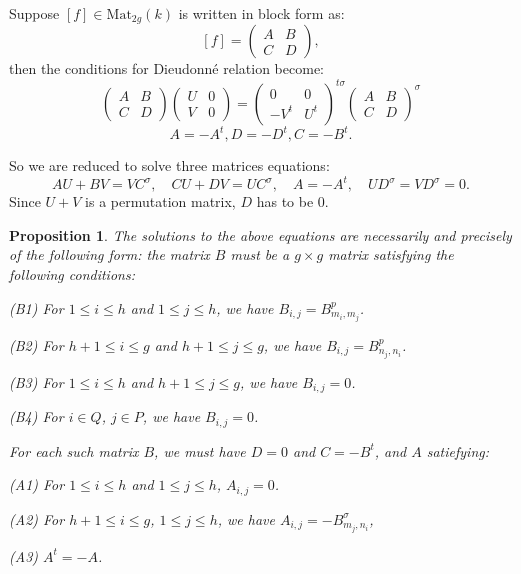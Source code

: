 \documentclass[a4paper,12pt,twoside]{report}
\newtheorem{proposition}[theorem]{Proposition}
\begin{document}
Suppose $[f]\in \mathrm{Mat}_{2g}(k)$ is written in block form as: 
\[[f]=\left(\begin{matrix}
    A&B\\
    C&D
\end{matrix}\right),\]
then the conditions for Dieudonn\'e relation become: 
\begin{equation}\label{F-equation}
    \left(\begin{matrix}
        A&B\\
        C&D
    \end{matrix}\right)\left(\begin{matrix}
        U&0\\
        V&0
    \end{matrix}\right)=\left(\begin{matrix}
        0&0\\
        -V^t&U^t
    \end{matrix}\right)^{t\sigma}\left(\begin{matrix}
        A&B\\
        C&D
    \end{matrix}\right)^\sigma
\end{equation}
\[A=-A^t,D=-D^t,C=-B^t.\]

So we are reduced to solve three matrices equations: 
\[AU+BV=V C^{\sigma}, \quad CU+DV=U C^{\sigma}, \quad A=-A^t, \quad UD^\sigma=VD^\sigma=0.\]
Since $U+V$ is a permutation matrix, $D$ has to be $0$.

\begin{proposition}\label{solutions}
    The solutions to the above equations are necessarily and precisely of the following form:
    the matrix $B$ must be a $g\times g$ matrix satisfying the following conditions: 

{\rm(B1)} For $1\leqslant i\leqslant h$ and $1\leqslant j\leqslant h$, we have $B_{i,j}=B_{m_i,m_j}^p$.

{\rm(B2)} For $h+1\leqslant i\leqslant g$ and $h+1\leqslant j\leqslant g$, we have $B_{i,j}=B_{n_j,n_i}^p$.

{\rm(B3)} For $1\leqslant i\leqslant h$ and $h+1\leqslant j \leqslant g$, we have $B_{i,j}=0$. 

{\rm(B4)} For $i\in Q$, $j\in P$, we have $B_{i,j}=0$. 

For each such matrix $B$, we must have $D=0$ and $C=-B^t$, and $A$ satiefying: 

{\rm(A1)} For  $1\leqslant i\leqslant h$ and $1\leqslant j\leqslant h$, $A_{i,j}=0$.

{\rm(A2)} For $h+1\leqslant i\leqslant g$, $1\leqslant j \leqslant h$, we have $A_{i,j}=-B_{m_j,n_i}^\sigma$, 

{\rm(A3)} $A^t=-A$.
\end{proposition}
\end{document}
